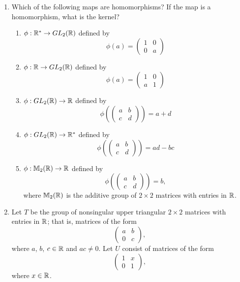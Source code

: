 {\begin{enumerate}
 
 
\bf\item\rm
Which of the following maps are homomorphisms? If the map is a
homomorphism, what is the kernel? 
\begin{enumerate}
 
 \bf\item\rm
$\phi : {\Bbb R}^\ast \rightarrow GL_2 ( {\Bbb R})$ defined by
$$
\phi( a ) =
\left(
\begin{array}{cc}
1 & 0 \\
0 & a
\end{array}
\right)
$$
 
 \bf\item\rm
$\phi : {\Bbb R} \rightarrow GL_2 ( {\Bbb R})$ defined by
$$
\phi( a ) =
\left(
\begin{array}{cc}
1 & 0 \\
a & 1
\end{array}
\right)
$$
 
 \bf\item\rm
$\phi : GL_2 ({\Bbb R})   \rightarrow {\Bbb R}$ defined by
$$
\phi
\left(
\left(
\begin{array}{cc}
a & b \\
c & d
\end{array}
\right)
\right)
= a + d
$$
 
 \bf\item\rm
$\phi : GL_2 ( {\Bbb R})   \rightarrow {\Bbb R}^\ast$ defined by 
$$
\phi
\left(
\left(
\begin{array}{cc}
a & b \\
c & d
\end{array}
\right)
\right)
= ad -bc
$$
 
 \bf\item\rm
$\phi : {\Bbb M}_2( {\Bbb R})   \rightarrow {\Bbb R}$ defined by
$$
\phi
\left(
\left(
\begin{array}{cc}
a & b \\
c & d
\end{array}
\right)
\right)
= b,
$$
where ${\Bbb M}_2( {\Bbb R})$ is the additive group of $2 \times
2$ matrices with entries in ${\Bbb R}$.
 
\end{enumerate}
 
 
\bf\item\rm
Let $T$ be the group of nonsingular upper triangular $2 \times 2$
matrices with entries in ${\Bbb R}$; that is, matrices of the form
$$
\left(
\begin{array}{cc}
a & b \\
0 & c
\end{array}
\right),
$$
where $a$, $b$, $c \in {\Bbb R}$ and $ac \neq 0$. Let $U$ consist of
matrices of the form 
$$
\left(
\begin{array}{cc}
1 & x \\
0 & 1
\end{array}
\right),
$$
where $x \in {\Bbb R}$.
\begin{enumerate}
 

\end{enumerate}
\end{enumerate}}
